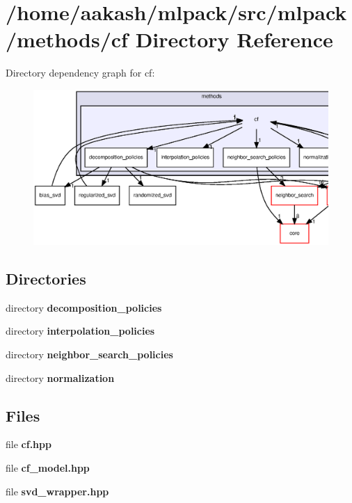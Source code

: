 \section{/home/aakash/mlpack/src/mlpack/methods/cf Directory Reference}
\label{dir_51f04b16a02a56d32fcaa62b5a9b38be}
Directory dependency graph for cf\+:
\nopagebreak
\begin{figure}[H]
\begin{center}
\leavevmode
\includegraphics[width=350pt]{dir_51f04b16a02a56d32fcaa62b5a9b38be_dep}
\end{center}
\end{figure}
\subsection*{Directories}
\begin{DoxyCompactItemize}
\item 
directory \textbf{ decomposition\+\_\+policies}
\item 
directory \textbf{ interpolation\+\_\+policies}
\item 
directory \textbf{ neighbor\+\_\+search\+\_\+policies}
\item 
directory \textbf{ normalization}
\end{DoxyCompactItemize}
\subsection*{Files}
\begin{DoxyCompactItemize}
\item 
file \textbf{ cf.\+hpp}
\item 
file \textbf{ cf\+\_\+model.\+hpp}
\item 
file \textbf{ svd\+\_\+wrapper.\+hpp}
\end{DoxyCompactItemize}
